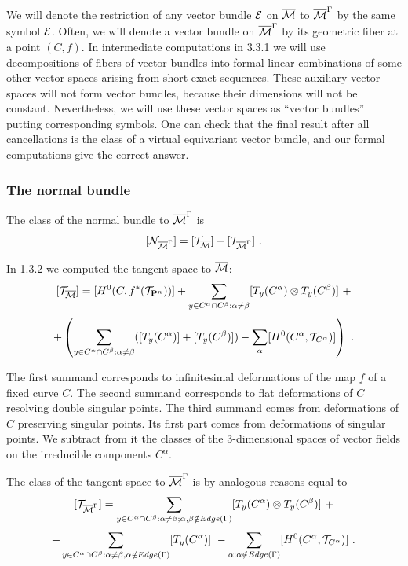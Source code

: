 \documentclass{amsart}
\begin{document}
 We will denote the restriction of any vector bundle $\mathcal E$ on $\overline{\mathcal{M}}$ to
$\overline{\mathcal{M}}^{\Gamma}$ by the same symbol $\mathcal E$. Often, we will denote a vector
bundle on $\overline{\mathcal{M}}^{\Gamma}$ by its geometric fiber
 at a point $(C,f)$.
In intermediate computations in 3.3.1  we will use decompositions of fibers of
vector bundles into  formal linear combinations of some other vector spaces
arising from short exact  sequences. These auxiliary
 vector spaces will not form vector bundles, because their dimensions  will not
be  constant. Nevertheless, we will use these vector spaces  as ``vector
bundles'' putting  corresponding symbols. One can check that the final result
after all cancellations is the  class of a virtual equivariant vector bundle,
and our formal computations give the correct answer.

\subsubsection{The normal bundle}


The class of the normal bundle to $\overline{\mathcal{M}}^{\Gamma}$ is
$$[\mathcal N_{\overline{\mathcal{M}}^{\Gamma}}]=[\mathcal T_{\overline{\mathcal{M}}}]-[\mathcal T_{\overline{\mathcal{M}}^{\Gamma}}]\,\,.$$

In 1.3.2 we computed the tangent space to $\overline{\mathcal{M}}$:
$$[\mathcal T_{\overline{\mathcal{M}}}]=[H^0(C,f^*(\mathcal T_{\mathbf P^n}))]+\displaystyle\sum_{y\in  C^{\alpha}\cap
C^{\beta}:\alpha\ne\beta} [T_y (C^{\alpha})\otimes T_y(C^{\beta})]\,\,+$$
$$+\left(\sum_{y\in C^{\alpha}\cap
C^{\beta}:\alpha\ne\beta}([T_y(C^{\alpha})]+[T_y(C^{\beta})])-\sum_{\alpha}[H^0(C^{\alpha}, \mathcal T_{C^{\alpha}})]\right)\,\,.$$

 The first summand corresponds to infinitesimal deformations of the map $f$ of
a fixed curve $C$. The second summand corresponds to flat deformations of $C$
resolving double singular points. The third summand comes from deformations of
$C$ preserving singular points. Its first part comes from deformations of
singular points. We subtract from it the classes of the $3$-dimensional spaces
of vector fields on the irreducible components $C^{\alpha}$.

The class of the tangent space to $\overline{\mathcal{M}}^{\Gamma}$ is
  by analogous reasons equal to
$$[\mathcal T_{\overline{\mathcal{M}}^{\Gamma}}]=\displaystyle\sum_{y\in  C^{\alpha}\cap
C^{\beta}:\alpha\ne\beta;\alpha, \beta\notin Edge(\Gamma)}
[T_y (C^{\alpha})\otimes T_y(C^{\beta})]\,\,+$$
$$+
\sum_{y\in C^{\alpha}\cap C^{\beta}:\alpha\ne\beta,\alpha\notin
Edge(\Gamma)}[T_y(C^{\alpha})]
\,\,-\sum_{\alpha:\alpha\notin Edge(\Gamma)}[H^0(C^{\alpha}, \mathcal
T_{C^{\alpha}})]\,\,.$$
\end{document}
